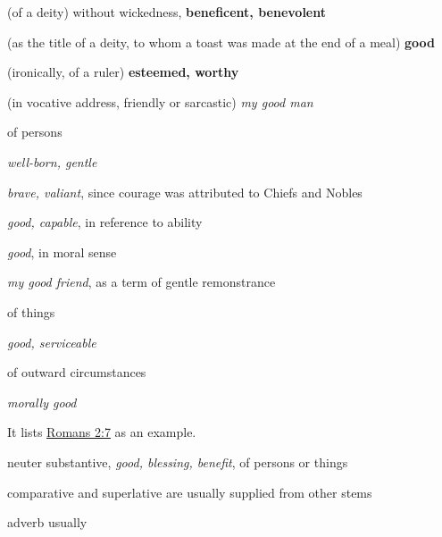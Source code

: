 \begin{compactdesc}
\begin{compactitem}
							\item[5] (of a deity) without wickedness, \textbf{beneficent, benevolent}
							\item[6] (as the title of a deity, to whom a toast was made at the end of a meal) \textbf{good}
							\item[7] (ironically, of a ruler) \textbf{esteemed, worthy}
							\item[8] (in vocative address, friendly or sarcastic) \textit{my good man}
						\end{compactitem}
					\item[LSJ 4b, PDF 77] \textbf{}
						\begin{compactitem}
							\item[I] of persons
							\item[I.1] \textit{well-born, gentle}
							\item[I.2] \textit{brave, valiant}, since courage was attributed to Chiefs and Nobles
							\item[I.3] \textit{good, capable}, in reference to ability
							\item[I.4] \textit{good}, in moral sense
							\item[I.5] \textit{my good friend}, as a term of gentle remonstrance
							\item[II] of things
							\item[II.1] \textit{good, serviceable}
							\item[II.2] of outward circumstances
							\item[II.3] \textit{morally good}
								\begin{compactitem}
									\item It lists \hyperref[ROMANS-2-7]{Romans 2:7} as an example.
								\end{compactitem}
							\item[II.4] neuter substantive, \textit{good, blessing, benefit}, of persons or things
							\item[III] comparative and superlative are usually supplied from other stems
							\item[IV] adverb usually 
						\end{compactitem}
				\end{compactdesc}
		
			\subparagraph{\texorpdfstring{}{}}
				\label{KALOS}
			
